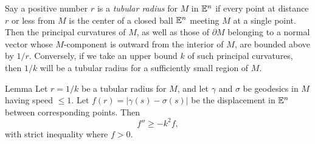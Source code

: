 Say a positive number $r$ is a \emph{tubular
radius} for $M$ in $\mathbb{E}^n$ if every point at distance $r$ or less from $M$ is the center of a
closed ball $\mathbb{E}^n$ meeting $M$ at a single point. Then the principal curvatures of $M$, as well as  those of $\partial M$ belonging to a normal
vector whose $M$-component is outward from the interior of $M$, are bounded
above by $1/r$. Conversely, if we take an upper bound $k$ of such principal
curvatures, then
$1/k$ will be a tubular radius for a sufficiently small region of $M$.


\begin{thm}{Lemma}\label{lem:diff-inequality} Let $r = 1/k$ be a tubular radius for $M$, and let $\gamma$ and $\sigma$ be
geodesics in $M$ having speed $\le 1$. Let $f(r) = |\gamma(s) - \sigma(s)|$ be the
displacement in $\mathbb{E}^n$ between corresponding points. Then 
$$f'' \ge -k^2f,$$ with strict inequality where $f> 0$.
\end{thm}


